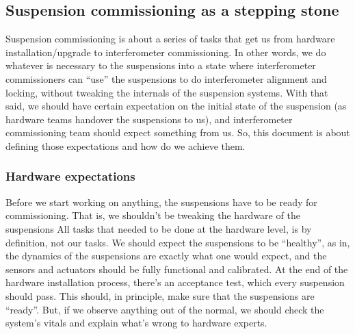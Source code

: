 \subsection{Suspension commissioning as a stepping stone}
Suspension commissioning is about a series of tasks that get us from hardware installation/upgrade to interferometer commissioning.
In other words, we do whatever is necessary to the suspensions into a state where interferometer commissioners can ``use'' the suspensions to do interferometer alignment and locking, without tweaking the internals of the suspension systems.
With that said, we should have certain expectation on the initial state of the suspension (as hardware teams handover the suspensions to us), and interferometer commissioning team should expect something from us.
So, this document is about defining those expectations and how do we achieve them.

\subsubsection{Hardware expectations}
Before we start working on anything, the suspensions have to be ready for commissioning.
That is, we shouldn't be tweaking the hardware of the suspensions
All tasks that needed to be done at the hardware level, is by definition, not our tasks.
We should expect the suspensions to be ``healthy'', as in, the dynamics of the suspensions are exactly what one would expect, and the sensors and actuators should be fully functional and calibrated.
At the end of the hardware installation process, there's an acceptance test, which every suspension should pass.
This should, in principle, make sure that the suspensions are ``ready''.
But, if we observe anything out of the normal, we should check the system's vitals and explain what's wrong to hardware experts.

